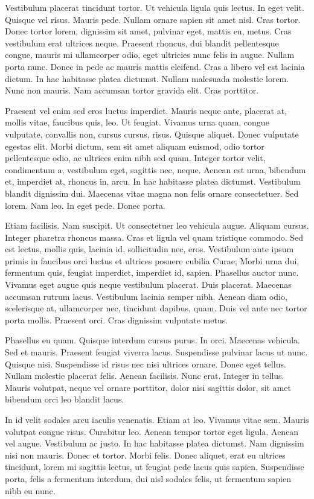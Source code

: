 \documentclass[../hdr.tex]{subfiles}
\begin{document}
Vestibulum placerat tincidunt tortor. Ut vehicula ligula quis lectus. In eget
velit. Quisque vel risus. Mauris pede. Nullam ornare sapien sit amet nisl. Cras
tortor. Donec tortor lorem, dignissim sit amet, pulvinar eget, mattis eu, metus.
Cras vestibulum erat ultrices neque. Praesent rhoncus, dui blandit pellentesque
congue, mauris mi ullamcorper odio, eget ultricies nunc felis in augue. Nullam
porta nunc. Donec in pede ac mauris mattis eleifend. Cras a libero vel est
lacinia dictum. In hac habitasse platea dictumst. Nullam malesuada molestie
lorem. Nunc non mauris. Nam accumsan tortor gravida elit. Cras porttitor.

Praesent vel enim sed eros luctus imperdiet. Mauris neque ante, placerat at,
mollis vitae, faucibus quis, leo. Ut feugiat. Vivamus urna quam, congue
vulputate, convallis non, cursus cursus, risus. Quisque aliquet. Donec vulputate
egestas elit. Morbi dictum, sem sit amet aliquam euismod, odio tortor
pellentesque odio, ac ultrices enim nibh sed quam. Integer tortor velit,
condimentum a, vestibulum eget, sagittis nec, neque. Aenean est urna, bibendum
et, imperdiet at, rhoncus in, arcu. In hac habitasse platea dictumst. Vestibulum
blandit dignissim dui. Maecenas vitae magna non felis ornare consectetuer. Sed
lorem. Nam leo. In eget pede. Donec porta.

Etiam facilisis. Nam suscipit. Ut consectetuer leo vehicula augue. Aliquam
cursus. Integer pharetra rhoncus massa. Cras et ligula vel quam tristique
commodo. Sed est lectus, mollis quis, lacinia id, sollicitudin nec, eros.
Vestibulum ante ipsum primis in faucibus orci luctus et ultrices posuere cubilia
Curae; Morbi urna dui, fermentum quis, feugiat imperdiet, imperdiet id, sapien.
Phasellus auctor nunc. Vivamus eget augue quis neque vestibulum placerat. Duis
placerat. Maecenas accumsan rutrum lacus. Vestibulum lacinia semper nibh. Aenean
diam odio, scelerisque at, ullamcorper nec, tincidunt dapibus, quam. Duis vel
ante nec tortor porta mollis. Praesent orci. Cras dignissim vulputate metus.

Phasellus eu quam. Quisque interdum cursus purus. In orci. Maecenas vehicula.
Sed et mauris. Praesent feugiat viverra lacus. Suspendisse pulvinar lacus ut
nunc. Quisque nisi. Suspendisse id risus nec nisi ultrices ornare. Donec eget
tellus. Nullam molestie placerat felis. Aenean facilisis. Nunc erat. Integer in
tellus. Mauris volutpat, neque vel ornare porttitor, dolor nisi sagittis dolor,
sit amet bibendum orci leo blandit lacus.

In id velit sodales arcu iaculis venenatis. Etiam at leo. Vivamus vitae sem.
Mauris volutpat congue risus. Curabitur leo. Aenean tempor tortor eget ligula.
Aenean vel augue. Vestibulum ac justo. In hac habitasse platea dictumst. Nam
dignissim nisi non mauris. Donec et tortor. Morbi felis. Donec aliquet, erat eu
ultrices tincidunt, lorem mi sagittis lectus, ut feugiat pede lacus quis sapien.
Suspendisse porta, felis a fermentum interdum, dui nisl sodales felis, ut
fermentum sapien nibh eu nunc.
\end{document}
